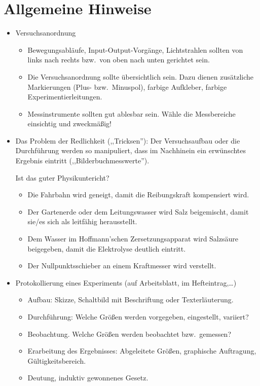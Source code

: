 \section{Allgemeine Hinweise}
\begin{itemize}

	\item
	Versuchsanordnung
	\begin{itemize}
		\item
		Bewegungsabl\"{a}ufe, Input-Output-Vorg\"{a}nge, Lichtstrahlen
		sollten von links nach rechts bzw.\ von oben nach unten
		gerichtet sein.
		
		\item
		Die Versuchsanordnung sollte \"{u}bersichtlich sein.
		Dazu dienen zus\"{a}tzliche Markierungen (Plus- bzw.\ Minuspol),
		farbige Aufkleber, farbige Experimentierleitungen.
		\item
		Messinstrumente sollten gut ablesbar sein.
		W\"{a}hle die Messbereiche einsichtig und zweckm\"{a}{\ss}ig!
	\end{itemize}
	
	\item
	Das Problem der Redlichkeit (,,Tricksen''):
	Der Versuchsaufbau oder die Durchf\"{u}hrung werden so
	manipuliert, dass im Nachhinein ein erw\"{u}nschtes Ergebnis
	eintritt (,,Bilderbuchmesswerte'').
	
	Ist das guter Physikuntericht?
	
	\begin{beisp2}
	\begin{itemize}
		\item
		Die Fahrbahn wird geneigt, damit die Reibungskraft
		kompensiert wird.
		\item
		Der Gartenerde oder dem Leitungswasser wird Salz beigemischt,
		damit sie/es sich als leitf\"{a}hig herausstellt.
		\item
		Dem Wasser im Hoffmann'schen Zersetzungsapparat wird Salzs\"{a}ure
		beigegeben, damit die Elektrolyse deutlich eintritt.
		\item
		Der Nullpunktsschieber an einem Kraftmesser wird verstellt.
	\end{itemize}
	\end{beisp2}
	
	\item
	Protokollierung eines Experiments
	(auf Arbeitsblatt, im Hefteintrag,\dots)
	\begin{itemize}
		\item
		Aufbau: Skizze, Schaltbild mit
		Beschriftung oder Texterl\"{a}uterung.
		\item
		Durchf\"{u}hrung:
		Welche Gr\"{o}{\ss}en werden vorgegeben, eingestellt, variiert?
		\item
		Beobachtung.
		Welche Gr\"{o}{\ss}en werden beobachtet bzw.\ gemessen?
		\item
		Erarbeitung des Ergebnisses: Abgeleitete Gr\"{o}{\ss}en,
		graphische Auftragung, G\"{u}ltigkeitsbereich.
		\item
		Deutung, induktiv gewonnenes Gesetz.
	\end{itemize}
	

\end{itemize}
